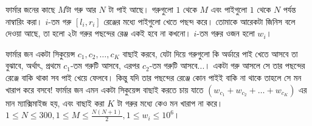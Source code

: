 \begin{example}[\href{http://www.usaco.org/index.php?page=viewproblem2&%
  cpid=972}{USACO - Greedy Pie Eaters}]
  ফার্মার জনের কাছে $M$টা গরু আর $N$ টা পাই আছে। গরুগুলো $1$ থেকে $M$ এবং
  পাইগুলো $1$ থেকে $N$ পর্যন্ত নাম্বারিং করা। $i$-তম গরু $[l_i, r_i]$ রেঞ্জের
  মধ্যে পাইগুলো খেতে পছন্দ করে। তোমাকে আরেকটা জিনিস বলে দেওয়া আছে, তা হলো ২টা
  গরুর পছন্দের রেঞ্জ একই হবে না কখনো। $i$-তম গরুর ওজন হলো $w_i$।

  \noindent ফার্মার জন একটা সিকুয়েন্স $c_1, c_2, \ldots, c_K$ বাছাই করবে,
  যেটা দিয়ে গরুগুলো কি অর্ডারে পাই খেতে আসবে তা বুঝাবে, অর্থাৎ, প্রথমে
  $c_1$-তম গরুটি আসবে, এরপর $c_2$-তম গরুটি আসবে...। একটা গরু আসলে সে তার
  পছন্দের রেঞ্জে বাকি থাকা সব পাই খেয়ে ফেলবে। কিন্তু যদি তার পছন্দের রেঞ্জে
  কোন পাইই বাকি না থাকে তাহলে সে মন খারাপ করে বসবে! ফার্মার জন এমন একটা
  সিকুয়েন্স বাছাই করতে চায় যাতে $(w_{c_1} + w_{c_2} + \ldots + w_{c_K})$ এর
  মান ম্যাক্সিমাইজ হয়, এবং বাছাই করা $K$ টা গরুর মধ্যে কেও মন খারাপ না করে।
  $1 \le N \le 300, 1 \le M \le \frac{N(N+1)}{2}, 1 \le w_i \le 10^6$।
\end{example}

